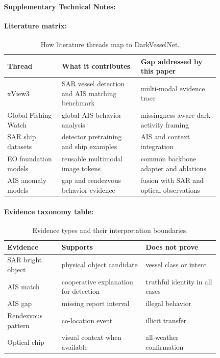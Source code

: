 \documentclass{article}
\begin{document}
\paragraph{Supplementary Technical Notes:}

\paragraph{Literature matrix:}

\begin{table}[t]
\centering
\caption{How literature threads map to DarkVesselNet.}
\begin{tabular}{@{}p{0.22\linewidth}p{0.32\linewidth}p{0.32\linewidth}@{}}
\toprule
\textbf{Thread} & \textbf{What it contributes} & \textbf{Gap addressed by this paper}\\
\midrule
xView3 & SAR vessel detection and AIS matching benchmark & multi-modal evidence trace\\
Global Fishing Watch & global AIS behavior analysis & missingness-aware dark activity framing\\
SAR ship datasets & detector pretraining and ship examples & AIS and context integration\\
EO foundation models & reusable multimodal image tokens & common backbone adapter and ablations\\
AIS anomaly models & gap and rendezvous behavior evidence & fusion with SAR and optical observations\\
\bottomrule
\end{tabular}
\end{table}

\paragraph{Evidence taxonomy table:}

\begin{table}[t]
\centering
\caption{Evidence types and their interpretation boundaries.}
\begin{tabular}{@{}p{0.22\linewidth}p{0.34\linewidth}p{0.30\linewidth}@{}}
\toprule
\textbf{Evidence} & \textbf{Supports} & \textbf{Does not prove}\\
\midrule
SAR bright object & physical object candidate & vessel class or intent\\
AIS match & cooperative explanation for detection & truthful identity in all cases\\
AIS gap & missing report interval & illegal behavior\\
Rendezvous pattern & co-location event & illicit transfer\\
Optical chip & visual context when available & all-weather confirmation\\
\bottomrule
\end{tabular}
\end{table}
\end{document}
